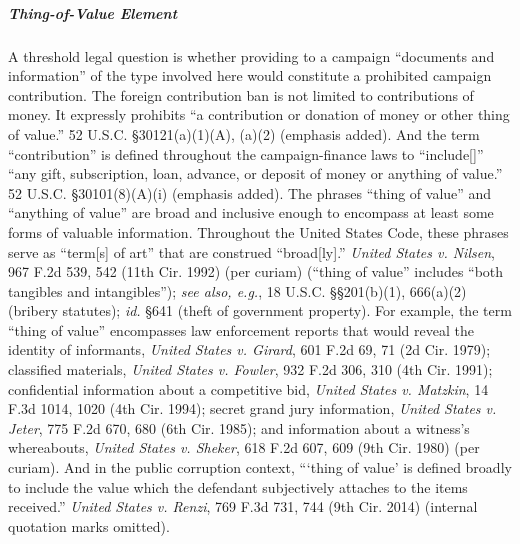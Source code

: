 \subparagraph{Thing-of-Value Element}
A threshold legal question is whether providing to a campaign ``documents and information'' of the type involved here would constitute a prohibited campaign contribution. 
The foreign contribution ban is not limited to contributions of money. 
It expressly prohibits ``a contribution or donation of money or other thing of value.''
52 U.S.C. \S 30121(a)(1)(A), (a)(2) (emphasis added). 
And the term ``contribution'' is defined throughout the campaign-finance laws to ``include[]'' ``any gift, subscription, loan, advance, or deposit of money or anything of value.''
52 U.S.C. \S 30101(8)(A)(i) (emphasis added).
The phrases ``thing of value'' and ``anything of value'' are broad and inclusive enough to encompass at least some forms of valuable information. 
Throughout the United States Code, these phrases serve as ``term[s] of art'' that are construed ``broad[ly].'' 
\textit{United States v. Nilsen}, 967 F.2d 539, 542 (11th Cir. 1992) (per curiam) (``thing of value'' includes ``both tangibles and intangibles''); \textit{see also, e.g.}, 18 U.S.C. \S\S 201(b)(1), 666(a)(2) (bribery statutes); \textit{id.} \S 641 (theft of government property). 
For example, the term ``thing of value'' encompasses law enforcement reports that would reveal the identity of informants, \textit{United States v. Girard}, 601 F.2d 69, 71 (2d Cir. 1979); classified materials, \textit{United States v. Fowler}, 932 F.2d 306, 310 (4th Cir. 1991); confidential information about a competitive bid, \textit{United States v. Matzkin}, 14 F.3d 1014, 1020 (4th Cir. 1994); secret grand jury information, \textit{United States v. Jeter}, 775 F.2d 670, 680 (6th Cir. 1985); and information about a witness's whereabouts, \textit{United States v. Sheker}, 618 F.2d 607, 609 (9th Cir. 1980) (per curiam). 
And in the public corruption context, ```thing of value' is defined broadly to include the value which the defendant subjectively attaches to the items received.'' 
\textit{United States v. Renzi}, 769 F.3d 731, 744 (9th Cir. 2014) (internal quotation marks omitted). 

